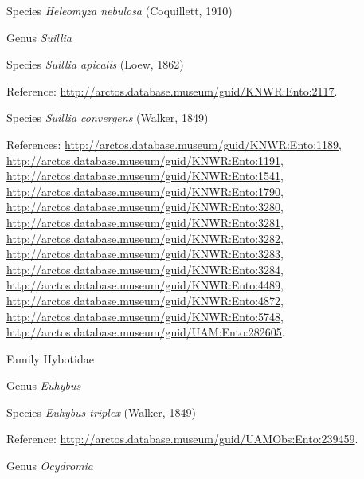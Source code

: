 \documentclass[9pt, article]{memoir}
\begin{document}
\begin{multicols}{2}
\vspace{6pt}\noindent\hspace{36pt}Species \textit{Heleomyza nebulosa} (Coquillett, 1910)


\vspace{6pt}\noindent\hspace{30pt}Genus \textit{Suillia}


\vspace{6pt}\noindent\hspace{36pt}Species \textit{Suillia apicalis} (Loew, 1862)


\vspace{6pt}Reference: 
\url{http://arctos.database.museum/guid/KNWR:Ento:2117}.

\vspace{6pt}\noindent\hspace{36pt}Species \textit{Suillia convergens} (Walker, 1849)


\vspace{6pt}References: 
\url{http://arctos.database.museum/guid/KNWR:Ento:1189}, 
\url{http://arctos.database.museum/guid/KNWR:Ento:1191}, 
\url{http://arctos.database.museum/guid/KNWR:Ento:1541}, 
\url{http://arctos.database.museum/guid/KNWR:Ento:1790}, 
\url{http://arctos.database.museum/guid/KNWR:Ento:3280}, 
\url{http://arctos.database.museum/guid/KNWR:Ento:3281}, 
\url{http://arctos.database.museum/guid/KNWR:Ento:3282}, 
\url{http://arctos.database.museum/guid/KNWR:Ento:3283}, 
\url{http://arctos.database.museum/guid/KNWR:Ento:3284}, 
\url{http://arctos.database.museum/guid/KNWR:Ento:4489}, 
\url{http://arctos.database.museum/guid/KNWR:Ento:4872}, 
\url{http://arctos.database.museum/guid/KNWR:Ento:5748}, 
\url{http://arctos.database.museum/guid/UAM:Ento:282605}.

\vspace{6pt}\noindent\hspace{24pt}Family Hybotidae


\vspace{6pt}\noindent\hspace{30pt}Genus \textit{Euhybus}


\vspace{6pt}\noindent\hspace{36pt}Species \textit{Euhybus triplex} (Walker, 1849)


\vspace{6pt}Reference: 
\url{http://arctos.database.museum/guid/UAMObs:Ento:239459}.

\vspace{6pt}\noindent\hspace{30pt}Genus \textit{Ocydromia}



\end{multicols}
\end{document}
